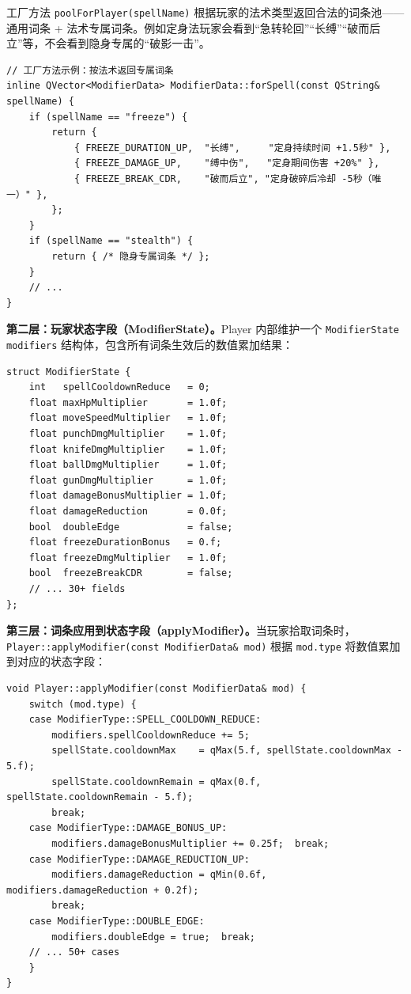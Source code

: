 \documentclass[utf8]{ctexart}
\begin{document}
工厂方法 \texttt{poolForPlayer(spellName)} 根据玩家的法术类型返回合法的词条池——通用词条 + 法术专属词条。例如定身法玩家会看到“急转轮回”“长缚”“破而后立”等，不会看到隐身专属的“破影一击”。

\begin{verbatim}
// 工厂方法示例：按法术返回专属词条
inline QVector<ModifierData> ModifierData::forSpell(const QString& spellName) {
    if (spellName == "freeze") {
        return {
            { FREEZE_DURATION_UP,  "长缚",     "定身持续时间 +1.5秒" },
            { FREEZE_DAMAGE_UP,    "缚中伤",   "定身期间伤害 +20%" },
            { FREEZE_BREAK_CDR,    "破而后立", "定身破碎后冷却 -5秒（唯一）" },
        };
    }
    if (spellName == "stealth") {
        return { /* 隐身专属词条 */ };
    }
    // ...
}
\end{verbatim}

\textbf{第二层：玩家状态字段（ModifierState）。}Player 内部维护一个 \texttt{ModifierState modifiers} 结构体，包含所有词条生效后的数值累加结果：

\begin{verbatim}
struct ModifierState {
    int   spellCooldownReduce   = 0;
    float maxHpMultiplier       = 1.0f;
    float moveSpeedMultiplier   = 1.0f;
    float punchDmgMultiplier    = 1.0f;
    float knifeDmgMultiplier    = 1.0f;
    float ballDmgMultiplier     = 1.0f;
    float gunDmgMultiplier      = 1.0f;
    float damageBonusMultiplier = 1.0f;
    float damageReduction       = 0.0f;
    bool  doubleEdge            = false;
    float freezeDurationBonus   = 0.f;
    float freezeDmgMultiplier   = 1.0f;
    bool  freezeBreakCDR        = false;
    // ... 30+ fields
};
\end{verbatim}

\textbf{第三层：词条应用到状态字段（applyModifier）。}当玩家拾取词条时，\texttt{Player::applyModifier(const ModifierData\& mod)} 根据 \texttt{mod.type} 将数值累加到对应的状态字段：

\begin{verbatim}
void Player::applyModifier(const ModifierData& mod) {
    switch (mod.type) {
    case ModifierType::SPELL_COOLDOWN_REDUCE:
        modifiers.spellCooldownReduce += 5;
        spellState.cooldownMax    = qMax(5.f, spellState.cooldownMax - 5.f);
        spellState.cooldownRemain = qMax(0.f, spellState.cooldownRemain - 5.f);
        break;
    case ModifierType::DAMAGE_BONUS_UP:
        modifiers.damageBonusMultiplier += 0.25f;  break;
    case ModifierType::DAMAGE_REDUCTION_UP:
        modifiers.damageReduction = qMin(0.6f, modifiers.damageReduction + 0.2f);
        break;
    case ModifierType::DOUBLE_EDGE:
        modifiers.doubleEdge = true;  break;
    // ... 50+ cases
    }
}
\end{verbatim}
\end{document}
